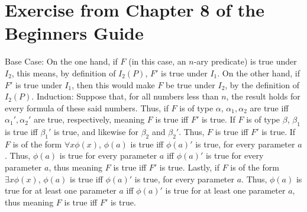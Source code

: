 \documentclass{article}
\theoremstyle{definition}
\begin{document}
\section*{Exercise from Chapter 8 of the Beginners Guide}


Base Case: On the one hand, if $F$ (in this case, an $n$-ary predicate) is true under $I_2$, this means, by definition of $I_2(P)$, $F'$ is true under 
$I_1$. On the other hand, if $F'$ is true under $I_1$, then this would make $F$ be true under $I_2$, by the definition of $I_2(P)$.\newline
Induction: Suppose that, for all numbers less than $n$, the result holds for every formula of these said numbers. Thus, if $F$ is of type $\alpha$, 
$\alpha_1,\alpha_2$ are true iff $\alpha_1',\alpha_2'$ are true, respectively, meaning $F$ is true iff $F'$ is true. If $F$ is of type $\beta$, 
$\beta_1$ is true iff $\beta_1'$ is true, and likewise for $\beta_2$ and $\beta_2'$. Thus, $F$ is true iff $F'$ is true. If $F$ is of the form 
$\forall x\phi(x)$, $\phi(a)$ is true iff $\phi(a)'$ is true, for every parameter $a$. Thus, $\phi(a)$ is true for every parameter $a$ iff 
$\phi(a)'$ is true for every parameter $a$, thus meaning $F$ is true iff $F'$ is true. Lastly, if $F$ is of the form $\exists x\phi(x)$, $\phi(a)$ 
is true iff $\phi(a)'$ is true, for every parameter $a$. Thus, $\phi(a)$ is true for at least one parameter $a$ iff $\phi(a)'$ is true for at least 
one parameter $a$, thus meaning $F$ is true iff $F'$ is true.
\end{document}
